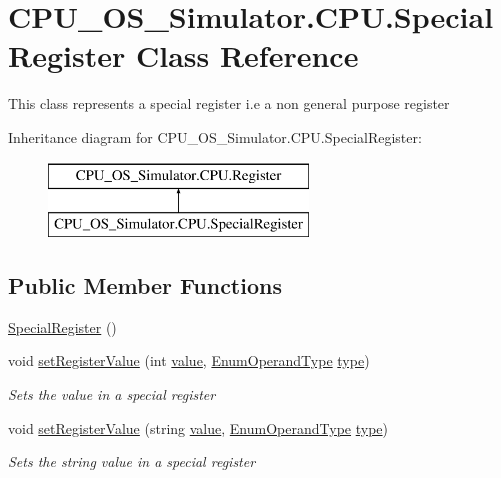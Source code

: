 \hypertarget{class_c_p_u___o_s___simulator_1_1_c_p_u_1_1_special_register}{}\section{C\+P\+U\+\_\+\+O\+S\+\_\+\+Simulator.\+C\+P\+U.\+Special\+Register Class Reference}
\label{class_c_p_u___o_s___simulator_1_1_c_p_u_1_1_special_register}


This class represents a special register i.\+e a non general purpose register  


Inheritance diagram for C\+P\+U\+\_\+\+O\+S\+\_\+\+Simulator.\+C\+P\+U.\+Special\+Register\+:\begin{figure}[H]
\begin{center}
\leavevmode
\includegraphics[height=2.000000cm]{class_c_p_u___o_s___simulator_1_1_c_p_u_1_1_special_register}
\end{center}
\end{figure}
\subsection*{Public Member Functions}
\begin{DoxyCompactItemize}
\item 
\hyperlink{class_c_p_u___o_s___simulator_1_1_c_p_u_1_1_special_register_a697f3e6f938ad7ab0ceee0555fe2c312}{Special\+Register} ()
\item 
void \hyperlink{class_c_p_u___o_s___simulator_1_1_c_p_u_1_1_special_register_ab76c9ab94069230fdf14821495ac9e9c}{set\+Register\+Value} (int \hyperlink{class_c_p_u___o_s___simulator_1_1_c_p_u_1_1_special_register_a040dbed0c42c3a45ccb7b01d181dd829}{value}, \hyperlink{namespace_c_p_u___o_s___simulator_1_1_c_p_u_ad49cfe442b74115a326c03b7ae848f76}{Enum\+Operand\+Type} \hyperlink{class_c_p_u___o_s___simulator_1_1_c_p_u_1_1_special_register_aae2bca6c1354013cca156bd19c30640d}{type})
\begin{DoxyCompactList}\small\item\em Sets the value in a special register \end{DoxyCompactList}\item 
void \hyperlink{class_c_p_u___o_s___simulator_1_1_c_p_u_1_1_special_register_a6c2605883e6349c10e92f5453c2ad9ea}{set\+Register\+Value} (string \hyperlink{class_c_p_u___o_s___simulator_1_1_c_p_u_1_1_special_register_a040dbed0c42c3a45ccb7b01d181dd829}{value}, \hyperlink{namespace_c_p_u___o_s___simulator_1_1_c_p_u_ad49cfe442b74115a326c03b7ae848f76}{Enum\+Operand\+Type} \hyperlink{class_c_p_u___o_s___simulator_1_1_c_p_u_1_1_special_register_aae2bca6c1354013cca156bd19c30640d}{type})
\begin{DoxyCompactList}\small\item\em Sets the string value in a special register \end{DoxyCompactList}\end{DoxyCompactItemize}
